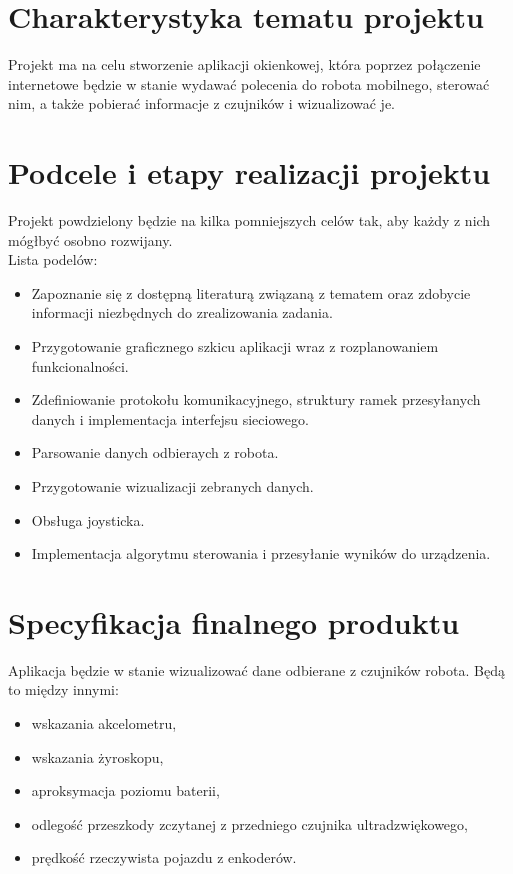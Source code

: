 \documentclass[12pt,a4paper,polish]{article}
\begin{document}
%
%
\pdfpageheight   297mm
\pdfpagewidth    210mm

\wdsStronaTytulowa
\wdsSpisTresci


 \section{Charakterystyka tematu projektu}
 \label{sekcja-charakterystyka}

  Projekt ma na celu stworzenie aplikacji okienkowej, która poprzez połączenie
  internetowe będzie w stanie wydawać polecenia do robota mobilnego, sterować nim,
  a także pobierać informacje z czujników i wizualizować je.

 \section{Podcele i etapy realizacji projektu}

  Projekt powdzielony będzie na kilka pomniejszych celów tak, aby każdy z nich
  mógłbyć osobno rozwijany. \\

  Lista podelów:
  \begin{itemize}
    \item Zapoznanie się z dostępną literaturą związaną z tematem oraz zdobycie 
    informacji niezbędnych do zrealizowania zadania.
    \item Przygotowanie graficznego szkicu aplikacji wraz z rozplanowaniem funkcionalności.
    \item Zdefiniowanie protokołu komunikacyjnego, struktury ramek przesyłanych danych
     i implementacja interfejsu sieciowego.
    \item Parsowanie danych odbieraych z robota.
    \item Przygotowanie wizualizacji zebranych danych.
    \item Obsługa joysticka.
    \item Implementacja algorytmu sterowania i przesyłanie wyników do urządzenia.
  \end{itemize}

 \section{Specyfikacja finalnego produktu}

  Aplikacja będzie w stanie wizualizować dane odbierane z czujników robota.
  Będą to między innymi:
  \begin{itemize}
    \item wskazania akcelometru,
    \item wskazania żyroskopu,
    \item aproksymacja poziomu baterii,
    \item odlegość przeszkody zczytanej z przedniego czujnika ultradzwiękowego,
    \item prędkość rzeczywista pojazdu z enkoderów.
  \end{itemize}
  
\end{document}
